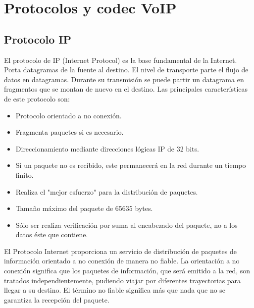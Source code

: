 \documentclass[12pt,letterpaper]{article}
\begin{document}
\newpage
\section{Protocolos y codec VoIP}
\subsection{Protocolo IP}
El protocolo de IP (Internet Protocol) es la base fundamental de la Internet. Porta 
datagramas de la fuente al destino. El nivel de transporte parte el flujo de datos en 
datagramas. Durante su transmisión se puede partir un datagrama en fragmentos que se 
montan de nuevo en el destino. Las principales características de este protocolo son:
\begin{itemize}
    \item Protocolo orientado a no conexión.
    \item Fragmenta paquetes si es necesario.
    \item Direccionamiento mediante direcciones lógicas IP de 32 bits.
    \item Si un paquete no es recibido, este permanecerá en la red durante un tiempo finito.
    \item Realiza el "mejor esfuerzo" para la distribución de paquetes.
    \item Tamaño máximo del paquete de 65635 bytes.
    \item Sólo ser realiza verificación por suma al encabezado del paquete, no a los datos éste que contiene.
\end{itemize}

El Protocolo Internet proporciona un servicio de distribución de paquetes de información 
orientado a no conexión de manera no fiable. La orientación a no conexión significa que los 
paquetes de información, que será emitido a la red, son tratados independientemente, pudiendo 
viajar por diferentes trayectorias para llegar a su destino. El término no fiable significa 
más que nada que no se garantiza la recepción del paquete.
\end{document}

